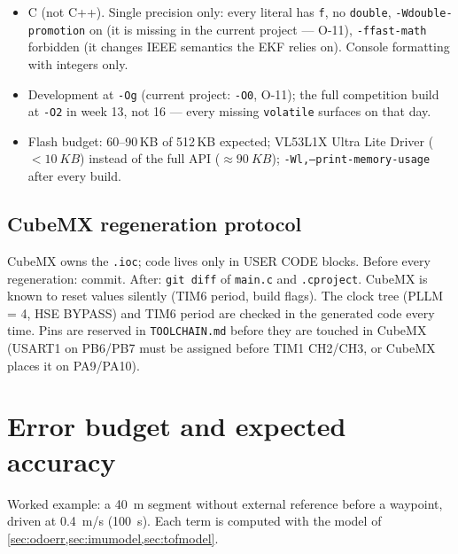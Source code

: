 \documentclass[11pt,a4paper]{article}
\newcommand{\code}[1]{\texttt{\small #1}}
\begin{document}
\begin{itemize}[leftmargin=6mm]
\item C (not C++). Single precision only: every literal has \code{f}, no
\code{double}, \code{-Wdouble-promotion} on (it is missing in the current project
--- O-11), \code{-ffast-math} forbidden (it changes IEEE semantics the EKF relies
on). Console formatting with integers only.
\item Development at \code{-Og} (current project: \code{-O0}, O-11); the full
competition build at \code{-O2} in week 13, not 16 --- every missing
\code{volatile} surfaces on that day.
\item Flash budget: 60--90\,KB of 512\,KB expected; VL53L1X Ultra Lite Driver
($<\qty{10}{KB}$) instead of the full API ($\approx\qty{90}{KB}$);
\code{-Wl,--print-memory-usage} after every build.
\end{itemize}

\subsection{CubeMX regeneration protocol}

CubeMX owns the \code{.ioc}; code lives only in USER CODE blocks. Before every
regeneration: commit. After: \code{git diff} of \code{main.c} and \code{.cproject}.
CubeMX is known to reset values silently (TIM6 period, build flags). The clock
tree (PLLM = 4, HSE BYPASS) and TIM6 period are checked in the generated code
every time. Pins are reserved in \code{TOOLCHAIN.md} before they are touched in
CubeMX (USART1 on PB6/PB7 must be assigned before TIM1 CH2/CH3, or CubeMX places
it on PA9/PA10).
\clearpage
\section{Error budget and expected accuracy}\label{sec:budget}

Worked example: a \qty{40}{m} segment without external reference before a
waypoint, driven at \qty{0.4}{m/s} (\qty{100}{s}). Each term is computed with
the model of \cref{sec:odoerr,sec:imumodel,sec:tofmodel}.
\end{document}
